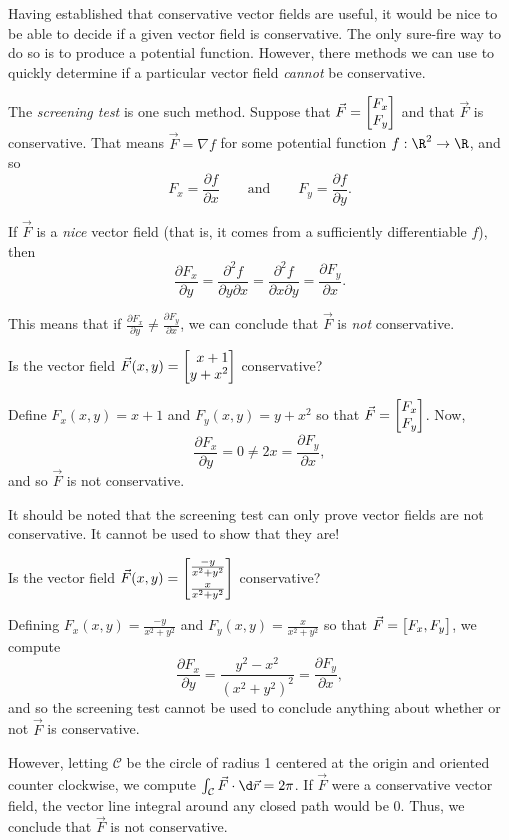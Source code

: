 \bigskip

Having established that conservative vector fields are useful,
it would be nice to be able to decide if a given vector field is
conservative.  The only sure-fire way to do so is to produce a 
potential function.  However, there methods we can use to quickly
determine if a particular vector field \emph{cannot} be conservative.

The \emph{screening test} 
\label{SECSCREENING}
is one such method.  Suppose that $\vec F=\mat{F_x\\F_y}$
and that $\vec F$ is conservative.  That means $\vec F=\nabla f$
for some potential function $f:\R^2\to\R$, and so
\[
	F_x = \frac{\partial f}{\partial x}\qquad\text{and}\qquad 
	F_y=\frac{\partial f}{\partial y}.
\]

If $\vec F$ is a \emph{nice} vector field (that is, it comes from a sufficiently differentiable
$f$), then
\[
	\frac{\partial F_x}{\partial y} = 
	\frac{\partial^2 f}{\partial y\partial x} = 
	\frac{\partial^2 f}{\partial x\partial y} = 
	\frac{\partial F_y}{\partial x}. 
\]

This means that if $\frac{\partial F_x}{\partial y} \neq \frac{\partial F_y}{\partial x}$,
we can conclude that $\vec F$ is \emph{not} conservative.

\begin{example}
	Is the vector field $\vec F(x,y)=\mat{x+1\\y+x^2}$ conservative?

	Define $F_x(x,y)=x+1$ and $F_y(x,y)=y+x^2$ so that $\vec F  =\mat{F_x\\F_y}$.
	Now,
	\[
		\frac{\partial F_x}{\partial y} = 0
		\neq 2x = 
		\frac{\partial F_y}{\partial x},
	\]
	and so $\vec F$ is not conservative.
\end{example}

It should be noted that the screening test can only prove vector fields
are not conservative.  It cannot be used to show that they are!

\begin{example}
	Is the vector field
	$\vec F(x,y) = \mat{\frac{-y}{x^2+y^2}\\[4pt]\frac{x}{x^2+y^2}}$ conservative?

	Defining $F_x(x,y)=\frac{-y}{x^2+y^2}$ and $F_y(x,y)=\frac{x}{x^2+y^2}$
	so that $\vec F = \mat{F_x,F_y}$, we compute
	\[
		\frac{\partial F_x}{\partial y} = \frac{y^2-x^2}{(x^2+y^2)^2}
		= 
		\frac{\partial F_y}{\partial x},
	\]
	and so the screening test cannot be used to conclude anything
	about whether or not $\vec F$ is conservative.

	
	However, letting $\mathcal C$ be the circle of radius 1 centered at the
	origin and oriented counter clockwise, we compute $\int_{\mathcal C} \vec F\cdot \d \vec r
	=2\pi$.  If $\vec F$ were a conservative vector field, the 
	vector line integral around any closed path would be $0$.  Thus, we conclude
	that $\vec F$ is not conservative.
	
\end{example}

